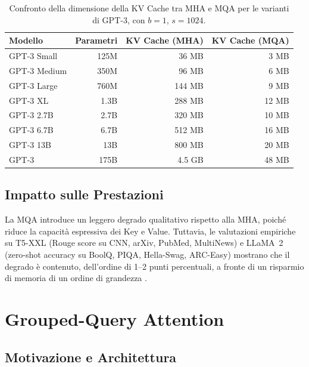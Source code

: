 \begin{table}[H]
  \centering
  \caption{Confronto della dimensione della KV Cache tra MHA e MQA per le
           varianti di GPT-3, con $b=1$, $s=1024$.}
  \label{tab:kv-cache-mha-vs-mqa}
  \small
  \begin{tabular}{lrrr}
    \toprule
    \textbf{Modello} & \textbf{Parametri} & \textbf{KV Cache (MHA)} & \textbf{KV Cache (MQA)} \\
    \midrule
    GPT-3 Small  & 125M  & 36 MB   & 3 MB   \\
    GPT-3 Medium & 350M  & 96 MB   & 6 MB   \\
    GPT-3 Large  & 760M  & 144 MB  & 9 MB   \\
    GPT-3 XL     & 1.3B  & 288 MB  & 12 MB  \\
    GPT-3 2.7B   & 2.7B  & 320 MB  & 10 MB  \\
    GPT-3 6.7B   & 6.7B  & 512 MB  & 16 MB  \\
    GPT-3 13B    & 13B   & 800 MB  & 20 MB  \\
    GPT-3        & 175B  & 4.5 GB  & 48 MB  \\
    \bottomrule
  \end{tabular}
\end{table}

\subsection{Impatto sulle Prestazioni}
\label{subsec:mqa-performance}

La MQA introduce un leggero degrado qualitativo rispetto alla MHA, poiché
riduce la capacità espressiva dei Key e Value. Tuttavia, le valutazioni
empiriche su T5-XXL (Rouge score su CNN, arXiv, PubMed, MultiNews) e LLaMA~2
(zero-shot accuracy su BoolQ, PIQA, Hella-Swag, ARC-Easy) mostrano che il
degrado è contenuto, dell'ordine di 1--2 punti percentuali, a fronte di
un risparmio di memoria di un ordine di grandezza \citep{shazeer2019fast}.

\section{Grouped-Query Attention}
\label{sec:gqa}

\subsection{Motivazione e Architettura}
\label{subsec:gqa-architecture}

